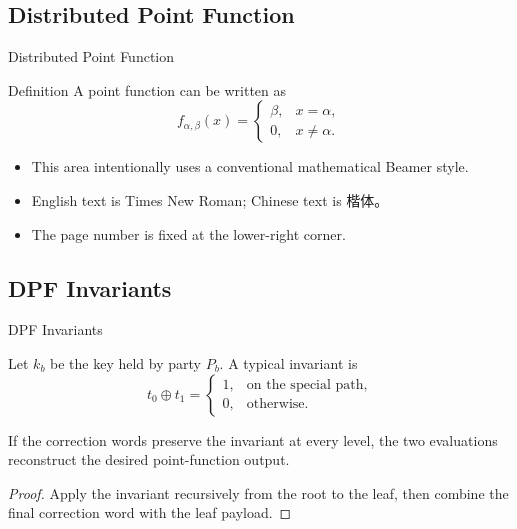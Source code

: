 \documentclass[aspectratio=169,11pt]{beamer}
\begin{document}
\subsection{Distributed Point Function}
\begin{frame}[t]{Distributed Point Function}
  \begin{MyPreContent}[top][left]
  \begin{block}{Definition}
    A point function can be written as
    \[
      f_{\alpha,\beta}(x)=
      \begin{cases}
        \beta, & x=\alpha,\\
        0,     & x\neq\alpha.
      \end{cases}
    \]
  \end{block}

  \vspace{2mm}
  \begin{itemize}
    \item This area intentionally uses a conventional mathematical Beamer style.
    \item English text is Times New Roman; Chinese text is 楷体。
    \item The page number is fixed at the lower-right corner.
  \end{itemize}
  \end{MyPreContent}
\end{frame}

\subsection{DPF Invariants}
\begin{frame}[t]{DPF Invariants}
  \begin{MyPreContent}[top][left]
  Let $k_b$ be the key held by party $P_b$. A typical invariant is
  \[
    t_0 \oplus t_1 =
    \begin{cases}
      1, & \text{on the special path},\\
      0, & \text{otherwise}.
    \end{cases}
  \]

  \begin{theorem}[Example]
    If the correction words preserve the invariant at every level, the two
    evaluations reconstruct the desired point-function output.
  \end{theorem}

  \begin{proof}
    Apply the invariant recursively from the root to the leaf, then combine the
    final correction word with the leaf payload.
  \end{proof}
  \end{MyPreContent}
\end{frame}
\end{document}
